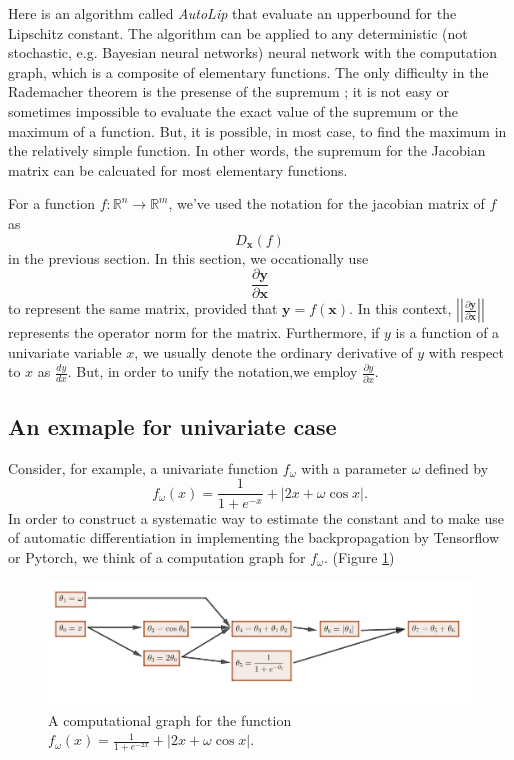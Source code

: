 \documentclass[12pt]{report}
\numberwithin{figure}{chapter}
\theoremstyle{plain}
\theoremstyle{definition}
\theoremstyle{corollary}
\theoremstyle{definition}
\theoremstyle{plain}
\theoremstyle{definition}
\theoremstyle{plain}
\begin{document}
Here is an algorithm called \emph{AutoLip} that evaluate an upperbound for the Lipschitz constant.
The algorithm can be applied to any deterministic (not stochastic, e.g. Bayesian neural networks) neural network with the computation graph, which is a composite of elementary functions.
The only difficulty in the Rademacher theorem is the presense of the supremum ; it is not easy or sometimes impossible to evaluate the exact value of the supremum or the maximum of a function.
But, it is possible, in most case, to find the maximum in the relatively simple function.
In other words, the supremum for the Jacobian matrix can be calcuated for most elementary functions.

For a function \(f:\mathbb R^n\to\mathbb R^m\), we've used the notation for the jacobian matrix of \(f\) as
\[D_{\boldsymbol x}(f)\]
in the previous section.
In this section, we occationally use
\[\frac{\partial\boldsymbol y}{\partial\boldsymbol x}\]
to represent the same matrix, provided that \(\boldsymbol y=f(\boldsymbol x)\).
In this context, \(\left|\left|\frac{\partial\boldsymbol y}{\partial\boldsymbol x}\right|\right|\) represents the operator norm for the matrix.
Furthermore, if \(y\) is a function of a univariate variable \(x\), we usually denote the ordinary derivative of \(y\) with respect to \(x\) as \(\frac{dy}{dx}\).
But, in order to unify the notation,we employ \(\frac{\partial y}{\partial x}\).


\subsection{An exmaple for  univariate case}
Consider, for example, a univariate function \(f_\omega\) with a parameter \(\omega\) defined by
\[f_\omega(x) = \frac1{1+e^{-x}}+\left|2x+\omega\cos x\right|.\]
In order to construct a systematic way to estimate the constant and to make use of automatic differentiation in implementing the backpropagation by Tensorflow or Pytorch, we think of a computation graph for \(f_\omega\). (Figure \ref{computational_graph})

\begin{figure}
\centering
\includegraphics[width=\textwidth]{computation_graph}
\caption{A computational graph for the function \(f_\omega(x)=\frac1{1+e^{-2x}}+\left|2x+\omega\cos x\right|.\)}
\label{computational_graph}
\end{figure}
\end{document}
